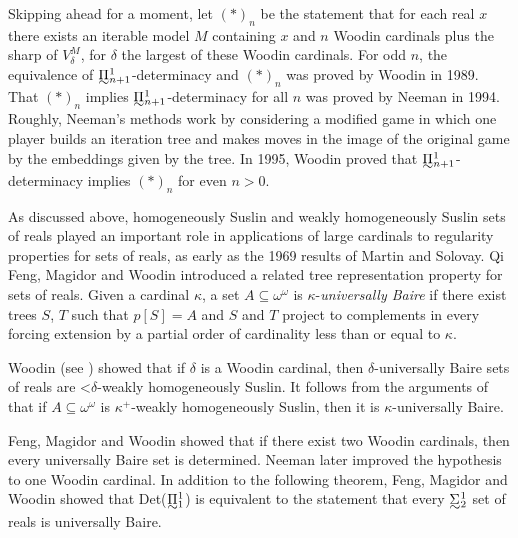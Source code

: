\documentclass{book}%
\def\underTilde#1{{\baselineskip=0pt\vtop{\hbox{$#1$}\hbox{$\sim$}}}{}}
\newcommand{\uTPi}{\underTilde{\Pi}}
\newcommand{\uTSigma}{\underTilde{\Sigma}}
\newcommand{\less}{\mathord{<}}
\begin{document}
Skipping ahead for a moment, let $(*)_{n}$ be the statement that for each real $x$ there exists
an iterable model $M$ containing $x$ and $n$ Woodin cardinals plus the sharp of $V_{\delta}^{M}$, for $\delta$ the largest of
these Woodin cardinals. For odd $n$, the equivalence of
$\uTPi^{1}_{n+1}$-determinacy and $(*)_{n}$ was proved by Woodin in
1989. That $(*)_{n}$ implies
$\uTPi^{1}_{n+1}$-determinacy for all $n$ was proved by
Neeman  in 1994. Roughly, Neeman's methods work by considering a modified game in
which one player builds an iteration tree and makes moves in the
image of the original game by the embeddings given by the tree. In 1995, Woodin proved that
$\uTPi^{1}_{n+1}$-determinacy implies $(*)_{n}$ for even
$n > 0$.




As discussed above, homogeneously Suslin and weakly homogeneously Suslin sets of reals
played an important role in applications of large cardinals to regularity properties for sets of reals, as early
as the 1969 results of Martin and Solovay. Qi Feng, Magidor and Woodin 
introduced a related tree representation
property for sets of reals. Given a cardinal $\kappa$, a set $A \subseteq\omega^{\omega}$ is $\kappa$-\emph{universally
Baire}  if
there exist trees $S$, $T$ such that $p[S] = A$ and $S$ and $T$
project to complements in every forcing extension by a partial order
of cardinality less than or equal to $\kappa$.

Woodin (see \cite{Kanamori, Larson:stationary}) showed that if
$\delta$ is a Woodin cardinal, then $\delta$-universally Baire sets
of reals are $\less\delta$-weakly homogeneously Suslin. It follows
from the arguments of \cite{MartinSolovay:1969} that if $A \subseteq\omega^{\omega}$ is
$\kappa^{+}$-weakly homogeneously Suslin, then it is
$\kappa$-universally Baire.

Feng, Magidor and Woodin showed that if there exist two Woodin
cardinals, then every universally Baire set is determined. Neeman
later improved the hypothesis to one Woodin cardinal. In addition to the following theorem, Feng, Magidor
and Woodin showed that Det($\uTPi^{1}_{1}$) is
equivalent to the statement that every $\uTSigma^{1}_{2}$ set of reals
is universally Baire.
\end{document}
